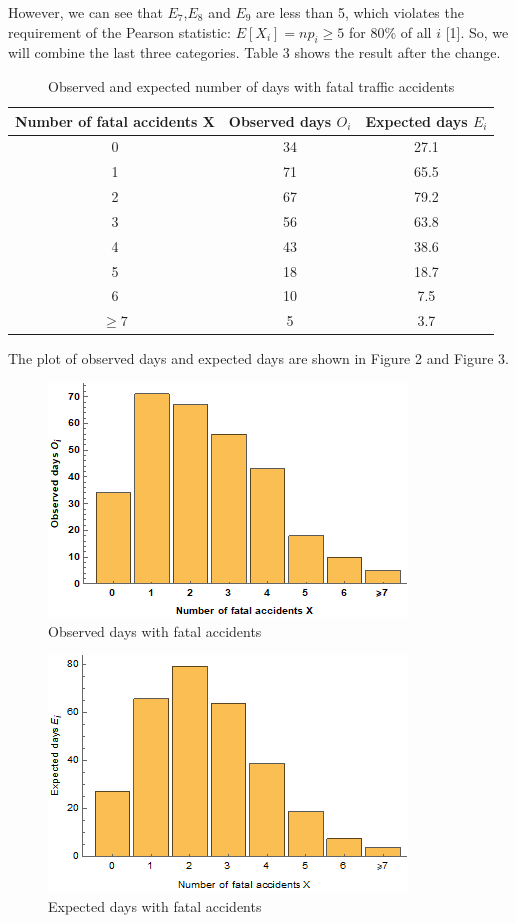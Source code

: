 \documentclass[a4paper,12pt]{article}
\begin{document}
\noindent However, we can see that $E_7$,$E_8$ and $E_9$ are less than 5, which violates the requirement of the Pearson statistic: $E[X_i]=np_i\geq 5$ for $80\%$ of all $i$ [1]. So, we will combine the last three categories. Table 3 shows the result after the change.\\
\begin{table}[hbp]
\centering
\begin{tabular}{|c|c|c|}
\hline
Number of fatal accidents X&Observed days $O_i$&Expected days $E_i$\\
\hline
0&34&27.1\\
\hline
1&71&65.5\\
\hline
2&67&79.2\\
\hline
3&56&63.8\\
\hline
4&43&38.6\\
\hline
5&18&18.7\\
\hline
6&10&7.5\\
\hline
$\ge7$&5&3.7\\
\hline
\end{tabular}
\caption{Observed and expected number of days with fatal traffic accidents}
\end{table}



\newpage
\noindent The plot of observed days and expected days are shown in Figure 2 and Figure 3.
\begin{figure}[hbp]
\centering
\includegraphics[scale=0.8]{1_11.png}
\caption{Observed days with fatal accidents}
\end{figure}

\begin{figure}[hbp]
\centering
\includegraphics[scale=0.8]{1_21.png}
\caption{Expected days with fatal accidents}
\end{figure}
\end{document}
